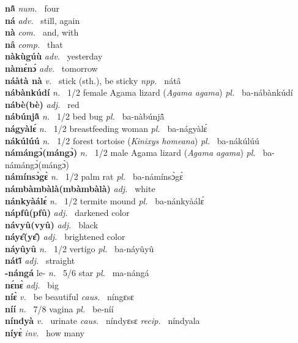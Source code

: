 \noindent
{\bfseries nã̂}  {\itshape num.~} four    \\ 
{\bfseries ná}  {\itshape adv.~} still, again    \\ 
{\bfseries nà}  {\itshape com.~} and, with    \\ 
{\bfseries nâ}  {\itshape comp.~} that    \\ 
{\bfseries nàkùgúù}  {\itshape adv.~} yesterday    \\ 
{\bfseries nàmɛ́nɔ́}  {\itshape adv.~} tomorrow    \\ 
{\bfseries náàtà nà}  {\itshape v.~} stick (sth.), be sticky   {\itshape npp.~} nátâ  \\ 
{\bfseries nábànkúdí} {\itshape n.~} 1/2 female Agama lizard ({\itshape Agama agama}) {\itshape pl.~} ba-nábànkúdí    \\ 
{\bfseries nábè(bè)} {\itshape adj.~} red    \\ 
{\bfseries nábúnjã̂} {\itshape n.~} 1/2 bed bug {\itshape pl.~} ba-nàbúnjã̂  \\ 
{\bfseries nágyàlɛ́} {\itshape n.~} 1/2 breastfeeding woman {\itshape pl.~} ba-nágyàlɛ́    \\ 
{\bfseries nákúlúú} {\itshape n.~} 1/2 forest tortoise ({\itshape Kinixys homeana}) {\itshape pl.~} ba-nákúlúú    \\ 
{\bfseries námángɔ̀(mángɔ̀)} {\itshape n.~} 1/2 male Agama lizard ({\itshape Agama agama}) {\itshape pl.~} ba-námángɔ̀(mángɔ̀)    \\ 
{\bfseries námínsɔ̀gɛ̀} {\itshape n.~} 1/2 palm rat {\itshape pl.~} ba-námínsɔ̀gɛ̀    \\ 
{\bfseries námbàmbàlà(mbàmbàlà)} {\itshape adj.~} white    \\ 
{\bfseries nánkyàálɛ́} {\itshape n.~} 1/2 termite mound {\itshape pl.~} ba-nánkyàálɛ́    \\ 
{\bfseries nápfû(pfû)} {\itshape adj.~} darkened color    \\ 
{\bfseries návyû(vyû)} {\itshape adj.~} black    \\ 
{\bfseries náyɛ̂(yɛ̂)}  {\itshape adj.~} brightened color    \\ 
{\bfseries náyûyû}  {\itshape n.~} 1/2 vertigo {\itshape pl.~} ba-náyûyû    \\ 
{\bfseries nátĩ̂}  {\itshape adj.~} straight    \\ 
{\bfseries -nángá} le- {\itshape n.~} 5/6 star {\itshape pl.~} ma-nángá    \\ 
{\bfseries nɛ́nɛ̀}  {\itshape adj.~} big    \\ 
{\bfseries níɛ̀}  {\itshape v.~} be beautiful   {\itshape caus.~} níngɛsɛ  \\ 
{\bfseries níí}  {\itshape n.~} 7/8 vagina {\itshape pl.~} be-níí    \\ 
{\bfseries níndyà}  {\itshape v.~} urinate   {\itshape caus.~} níndyɛsɛ  {\itshape recip.~} níndyala  \\ 
{\bfseries níyɛ̀}  {\itshape inv.~} how many    \\ 


